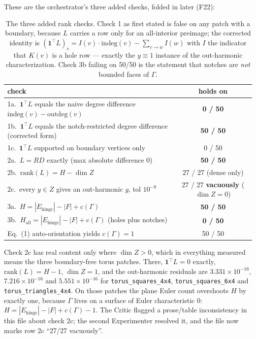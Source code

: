 \documentclass[10pt,a4paper]{article}
\newcommand{\fn}[1]{\nolinkurl{#1}}
\begin{document}
These are the orchestrator's three added checks, folded in later (F22):

\begin{table}[h]
\centering\small
\begin{tabular}{@{}lc@{}}
\toprule
check & holds on \\
\midrule
1a.\ $\mathbf 1^{\!\top}L$ equals the naive degree difference $\mathrm{indeg}(v)-\mathrm{outdeg}(v)$ & \textbf{0 / 50} \\
1b.\ $\mathbf 1^{\!\top}L$ equals the notch-restricted degree difference (corrected form) & \textbf{50 / 50} \\
1c.\ $\mathbf 1^{\!\top}L$ supported on boundary vertices only & 0 / 50 \\
2a.\ $L = RD$ exactly (max absolute difference 0) & \textbf{50 / 50} \\
2b.\ $\mathrm{rank}(L) = H - \dim Z$ & 27 / 27 (dense only) \\
2c.\ every $y\in Z$ gives an out-harmonic $g$, tol $10^{-9}$ & 27 / 27 \textbf{vacuously} ($\dim Z=0$) \\
3a.\ $H = |E_{\mathrm{hinge}}| - |F| + c(\Gamma)$ & \textbf{50 / 50} \\
3b.\ $H_{\mathrm{all}} = |E_{\mathrm{hinge}}| - |F| + c(\Gamma)$ (holes plus notches) & \textbf{0 / 50} \\
Eq.~(1) auto-orientation yields $c(\Gamma) = 1$ & 50 / 50 \\
\bottomrule
\end{tabular}
\caption{The three added rank checks. Check 1 as first stated is false on any patch with a
boundary, because $L$ carries a row only for an all-interior preimage; the corrected identity
is $(\mathbf 1^{\!\top}L)_v = I(v)\cdot\mathrm{indeg}(v) - \sum_{v\to w} I(w)$ with $I$ the
indicator that $K(v)$ is a hole row --- exactly the $y\equiv 1$ instance of the out-harmonic
characterization. Check 3b failing on 50/50 is the statement that notches are \emph{not}
bounded faces of $\Gamma$.}
\end{table}

Check 2c has real content only where $\dim Z > 0$, which in everything measured means the
three boundary-free torus patches. There, $\mathbf 1^{\!\top}L = 0$ exactly,
$\mathrm{rank}(L) = H-1$, $\dim Z = 1$, and the out-harmonic residuals are
$3.331\times10^{-16}$, $7.216\times10^{-16}$ and $5.551\times10^{-16}$ for
\fn{torus_squares_4x4}, \fn{torus_squares_6x4} and \fn{torus_triangles_4x4}. On those patches
the plane Euler count overshoots $H$ by exactly one, because $\Gamma$ lives on a surface of
Euler characteristic $0$: $H = |E_{\mathrm{hinge}}| - |F| + c(\Gamma) - 1$.
The Critic flagged a prose/table inconsistency in this file about check 2c; the second
Experimenter resolved it, and the file now marks row 2c ``27/27 vacuously''.
\end{document}
